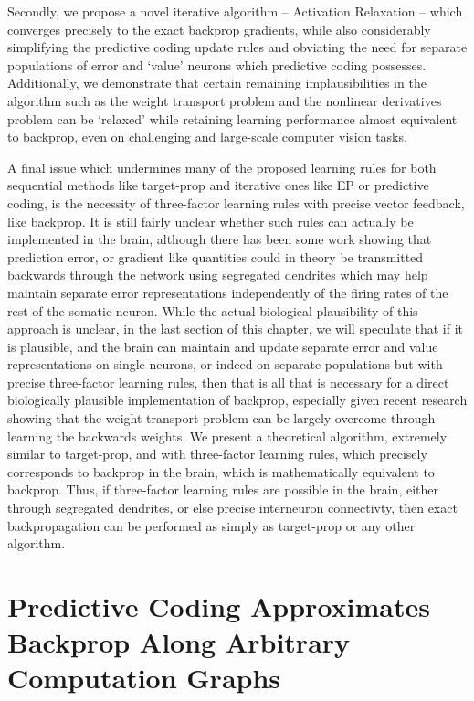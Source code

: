 Secondly, we propose a novel iterative algorithm -- Activation Relaxation \citep{millidge2020activation}-- which converges precisely to the exact backprop gradients, while also considerably simplifying the predictive coding update rules and obviating the need for separate populations of error and `value' neurons which predictive coding possesses. Additionally, we demonstrate that certain remaining implausibilities in the algorithm such as the weight transport problem and the nonlinear derivatives problem can be `relaxed' while retaining learning performance almost equivalent to backprop, even on challenging and large-scale computer vision tasks.

A final issue which undermines many of the proposed learning rules for both sequential methods like target-prop and iterative ones like EP or predictive coding, is the necessity of three-factor learning rules with precise vector feedback, like backprop. It is still fairly unclear whether such rules can actually be implemented in the brain, although there has been some work showing that prediction error, or gradient like quantities could in theory be transmitted backwards through the network using segregated dendrites \citep{sacramento2018dendritic} which may help maintain separate error representations independently of the firing rates of the rest of the somatic neuron. While the actual biological plausibility of this approach is unclear, in the last section of this chapter, we will speculate that if it is plausible, and the brain can maintain and update separate error and value representations on single neurons, or indeed on separate populations but with precise three-factor learning rules, then that is all that is necessary for a direct biologically plausible implementation of backprop, especially given recent research showing that the weight transport problem can be largely overcome through learning the backwards weights.  We present a theoretical algorithm, extremely similar to target-prop, and with three-factor learning rules, which precisely corresponds to backprop in the brain, which is mathematically equivalent to backprop. Thus, if three-factor learning rules are possible in the brain, either through segregated dendrites, or else precise interneuron connectivty, then exact backpropagation can be performed as simply as target-prop or any other algorithm.

\section{Predictive Coding Approximates Backprop Along Arbitrary Computation Graphs}

